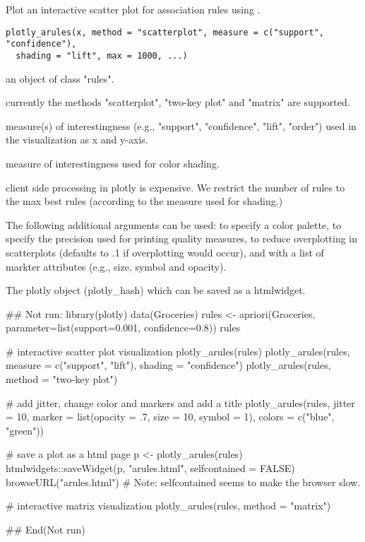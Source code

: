 \documentclass[letterpaper]{book}
\begin{document}
%
\begin{Description}\relax
Plot an interactive scatter plot for association rules using .
\end{Description}
%
\begin{Usage}
\begin{verbatim}
plotly_arules(x, method = "scatterplot", measure = c("support", "confidence"), 
  shading = "lift", max = 1000, ...)
\end{verbatim}
\end{Usage}
%
\begin{Arguments}
\begin{ldescription}
\item[\code{x}]  an object of class "rules". 
\item[\code{method}]  currently the methods "scatterplot", "two-key plot"
and "matrix" are supported.
\item[\code{measure}]  measure(s) of interestingness 
(e.g., "support", "confidence", "lift", "order") used in the visualization as x
and y-axis.
\item[\code{shading}]  measure of interestingness used for color shading.
\item[\code{max}]  client side processing in plotly is expensive. We restrict the 
number of rules to the max best rules (according to the measure used for shading.)
\item[\code{...}]  The following additional arguments can be used:  to specify a color palette, 
to specify the precision used for printing quality measures,
 to reduce overplotting in scatterplots 
(defaults to .1 if overplotting would occur), and  with 
a list of markter attributes (e.g., size, symbol and opacity).
\end{ldescription}
\end{Arguments}
%
\begin{Value}
The plotly object (plotly\_hash) which can be saved as a htmlwidget.
\end{Value}
%
\begin{Examples}
\begin{ExampleCode}
## Not run:  
library(plotly)
data(Groceries)
rules <- apriori(Groceries, parameter=list(support=0.001, confidence=0.8))
rules

# interactive scatter plot visualization
plotly_arules(rules)
plotly_arules(rules, measure = c("support", "lift"), shading = "confidence")
plotly_arules(rules, method = "two-key plot")

# add jitter, change color and markers and add a title
plotly_arules(rules, jitter = 10, 
  marker = list(opacity = .7, size = 10, symbol = 1), 
  colors = c("blue", "green")) 


# save a plot as a html page
p <- plotly_arules(rules)
htmlwidgets::saveWidget(p, "arules.html", selfcontained = FALSE)
browseURL("arules.html")
# Note: selfcontained seems to make the browser slow.

# interactive matrix visualization
plotly_arules(rules, method = "matrix") 

## End(Not run)
\end{ExampleCode}
\end{Examples}
\end{document}
